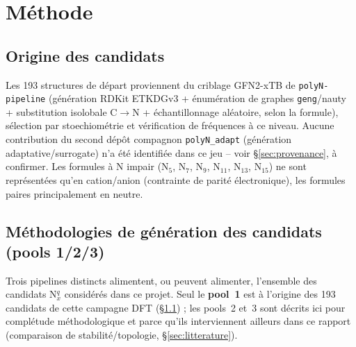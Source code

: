 \documentclass[11pt,a4paper]{article}
\begin{document}
\tableofcontents

\section{M\'ethode}

\subsection{Origine des candidats}
\label{sec:origine}

Les 193 structures de d\'epart proviennent du criblage GFN2-xTB de
\texttt{polyN-pipeline} (g\'en\'eration RDKit ETKDGv3 + \'enum\'eration de
graphes \texttt{geng}/nauty + substitution isolobale C$\to$N +
\'echantillonnage al\'eatoire, selon la formule), s\'election par
stoechiom\'etrie et v\'erification de fr\'equences \`a ce niveau. Aucune
contribution du second d\'ep\^ot compagnon \texttt{polyN\_adapt}
(g\'en\'eration adaptative/surrogate) n'a \'et\'e identifi\'ee dans ce
jeu -- voir \S\ref{sec:provenance}, \`a confirmer.
Les formules \`a N impair (N$_5$, N$_7$, N$_9$, N$_{11}$, N$_{13}$,
N$_{15}$) ne sont repr\'esent\'ees qu'en cation/anion (contrainte de
parit\'e \'electronique), les formules paires principalement en neutre.

\subsection{M\'ethodologies de g\'en\'eration des candidats (pools 1/2/3)}
\label{sec:pools}

Trois pipelines distincts alimentent, ou peuvent alimenter, l'ensemble des
candidats N$_x^{q}$ consid\'er\'es dans ce projet. Seul le \textbf{pool~1}
est \`a l'origine des 193 candidats de cette campagne DFT
(\S\ref{sec:origine}) ; les pools~2 et~3 sont d\'ecrits ici pour
compl\'etude m\'ethodologique et parce qu'ils interviennent ailleurs dans
ce rapport (comparaison de stabilit\'e/topologie, \S\ref{sec:litterature}).
\end{document}
